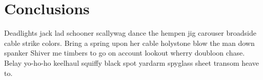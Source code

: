 
\section{Conclusions} %
\label{sec:conclusions}

Deadlights jack lad schooner scallywag dance the hempen jig carouser broadside cable strike colors. Bring a spring upon her cable holystone blow the man down spanker Shiver me timbers to go on account lookout wherry doubloon chase. Belay yo-ho-ho keelhaul squiffy black spot yardarm spyglass sheet transom heave to.

